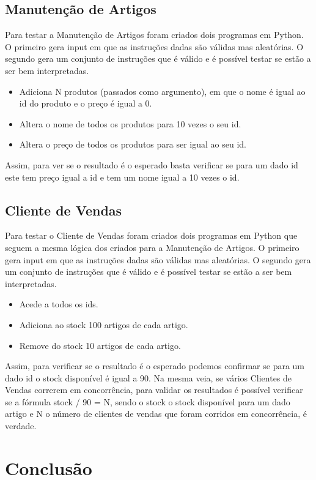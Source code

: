 \documentclass[a4paper]{report}
\begin{document}
\section{Manutenção de Artigos}

Para testar a Manutenção de Artigos foram criados dois programas em Python.
O primeiro gera input em que as instruções dadas são válidas mas aleatórias.
O segundo gera um conjunto de instruções que é válido e é possível testar se estão
a ser bem interpretadas.
\begin{itemize} 
    \item Adiciona N produtos (passados como argumento), em que o nome é igual ao id do
        produto e o preço é igual a 0.
    \item Altera o nome de todos os produtos para 10 vezes o seu id.
    \item Altera o preço de todos os produtos para ser igual ao seu id.
\end{itemize}
Assim, para ver se o resultado é o esperado basta verificar se para um dado id
este tem preço igual a id e tem um nome igual a 10 vezes o id.

\section{Cliente de Vendas}

Para testar o Cliente de Vendas foram criados dois programas em Python que
seguem a mesma lógica dos criados para a Manutenção de Artigos.
O primeiro gera input em que as instruções dadas são válidas mas aleatórias.
O segundo gera um conjunto de instruções que é válido e é possível testar se estão
a ser bem interpretadas.
\begin{itemize} 
    \item Acede a todos os ids.
    \item Adiciona ao stock 100 artigos de cada artigo.
    \item Remove do stock 10 artigos de cada artigo.
\end{itemize}
Assim, para verificar se o resultado é o esperado podemos confirmar se para um dado
id o stock disponível é igual a 90.
Na mesma veia, se vários Clientes de Vendas correrem em concorrência, para validar
os resultados é possível verificar se a fórmula stock / 90 = N, sendo o stock o stock
disponível para um dado artigo e N o número de clientes de vendas que foram corridos
em concorrência, é verdade.

\chapter{Conclusão}
\end{document}
